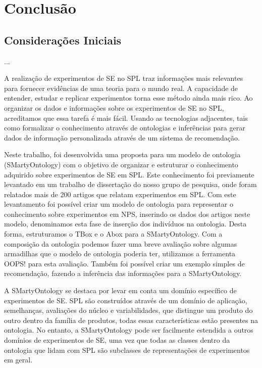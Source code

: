 \chapter{Conclusão}
\label{sec:conclusao}


\section{Considerações Iniciais}
\label{sec:concidaracoes_iniciais}

...

A realização de experimentos de SE no SPL traz informações mais relevantes para fornecer evidências de uma teoria para o mundo real. A capacidade de entender, estudar e replicar experimentos torna esse método ainda mais rico. Ao organizar os dados e informações sobre os experimentos de SE no SPL, acreditamos que essa tarefa é mais fácil. Usando as tecnologias adjacentes, tais como formalizar o conhecimento através de ontologias e inferências para gerar dados de informação personalizada através de um sistema de recomendação.

Neste trabalho, foi desenvolvida uma proposta para um modelo de ontologia (SMartyOntology) com o objetivo de organizar e estruturar o conhecimento adquirido sobre experimentos de SE em SPL. Este conhecimento foi previamente levantado em um trabalho de dissertação do nosso grupo de pesquisa, onde foram relatados mais de 200 artigos que relatam experimentos em SPL. Com este levantamento foi possível criar um modelo de ontologia para representar o conhecimento sobre experimentos em NPS, inserindo os dados dos artigos neste modelo, denominamos esta fase de inserção dos indivíduos na ontologia. Desta forma, estruturamos o TBox e o Abox para a SMartyOntology. Com a composição da ontologia podemos fazer uma breve avaliação sobre algumas armadilhas que o modelo de ontologia poderia ter, utilizamos a ferramenta OOPS! para esta avaliação. Também foi possível criar um exemplo simples de recomendação, fazendo a inferência das informações para a SMartyOntology.

A SMartyOntology se destaca por levar em conta um domínio específico de experimentos de SE. SPL são construídos através de um domínio de aplicação, semelhanças, avaliações do núcleo e variabilidades, que distingue um produto do outro dentro da família de produtos, todas essas características estão presentes na ontologia. No entanto, a SMartyOntology pode ser facilmente estendida a outros domínios de experimentos de SE, uma vez que todas as classes dentro da ontologia que lidam com SPL são subclasses de representações de experimentos em geral.

